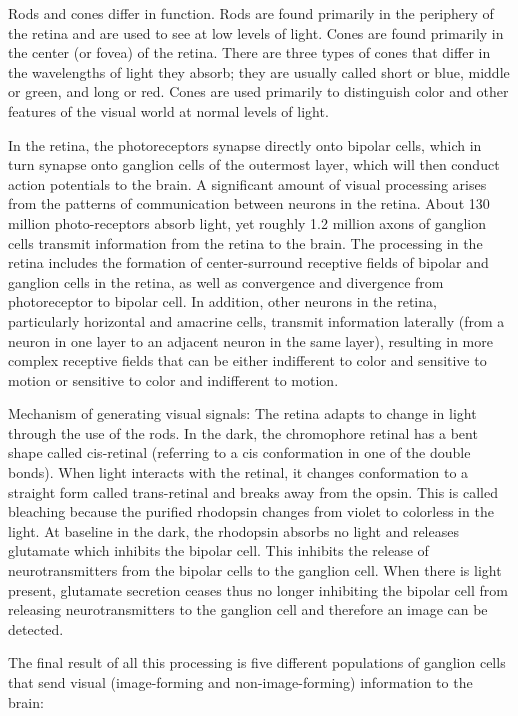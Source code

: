 Rods and cones differ in function. Rods are found primarily in the periphery of the retina and are used to see at low levels of light. Cones are found primarily in the center (or fovea) of the retina. There are three types of cones that differ in the wavelengths of light they absorb; they are usually called short or blue, middle or green, and long or red. Cones are used primarily to distinguish color and other features of the visual world at normal levels of light.

In the retina, the photoreceptors synapse directly onto bipolar cells, which in turn synapse onto ganglion cells of the outermost layer, which will then conduct action potentials to the brain. A significant amount of visual processing arises from the patterns of communication between neurons in the retina. About 130 million photo-receptors absorb light, yet roughly 1.2 million axons of ganglion cells transmit information from the retina to the brain. The processing in the retina includes the formation of center-surround receptive fields of bipolar and ganglion cells in the retina, as well as convergence and divergence from photoreceptor to bipolar cell. In addition, other neurons in the retina, particularly horizontal and amacrine cells, transmit information laterally (from a neuron in one layer to an adjacent neuron in the same layer), resulting in more complex receptive fields that can be either indifferent to color and sensitive to motion or sensitive to color and indifferent to motion.

Mechanism of generating visual signals: The retina adapts to change in light through the use of the rods. In the dark, the chromophore retinal has a bent shape called cis-retinal (referring to a cis conformation in one of the double bonds). When light interacts with the retinal, it changes conformation to a straight form called trans-retinal and breaks away from the opsin. This is called bleaching because the purified rhodopsin changes from violet to colorless in the light. At baseline in the dark, the rhodopsin absorbs no light and releases glutamate which inhibits the bipolar cell. This inhibits the release of neurotransmitters from the bipolar cells to the ganglion cell. When there is light present, glutamate secretion ceases thus no longer inhibiting the bipolar cell from releasing neurotransmitters to the ganglion cell and therefore an image can be detected.

The final result of all this processing is five different populations of ganglion cells that send visual (image-forming and non-image-forming) information to the brain:

